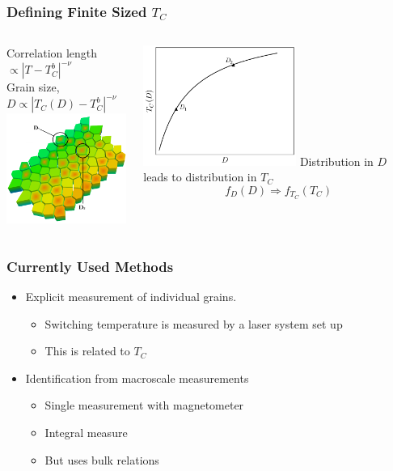 \documentclass{beamer}
\begin{document}
\begin{frame}
	\frametitle{Defining Finite Sized $T_C$}
	\begin{columns}
		\column{6cm}
		\begin{center}
		Correlation length $\propto |T-T_C^b|^{-\nu}$ \\ \vspace{3mm}
		Grain size, $D \propto |T_C(D)-T_C^b|^{-\nu}$ \\ \vspace{3mm}
		\includegraphics[width=5cm]{Images/grains2}
		\end{center}
		\column{6cm}
		\begin{center}
		\includegraphics[width=5cm]{Images/TcD}
		\vspace{4mm}
		Distribution in $D$ leads to distribution in $T_C$
		$$
		f_D(D) \Longrightarrow f_{T_C}(T_C)
		$$
		\end{center}
	\end{columns}
\end{frame}

\begin{frame}
	\frametitle{Currently Used Methods}
	\vspace{4mm}
	\begin{itemize}
		\item{Explicit measurement of individual grains.\footnotemark[3]}
		\begin{itemize}
			\item{Switching temperature is measured by a laser system set up}
			\item{This is related to $T_C$}
		\end{itemize}
		\vspace{4mm}
		\item{Identification from macroscale measurements\footnotemark[4]}
		\begin{itemize}
			\item{Single measurement with magnetometer}
			\item{Integral measure}
			\item{But uses bulk relations}
		\end{itemize}
	\end{itemize}	
\end{frame}
\end{document}
